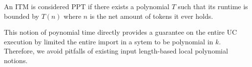\begin{center} {\small An ITM is considered PPT if there exists a polynomial $T$ such that its runtime is bounded by $T(n)$ where $n$ is the net amount of tokens it ever holds.} \end{center}

This notion of poynomial time directly provides a guarantee on the entire UC execution by limited the entire import in a sytem to be polynomial in $k$. Therefore, we avoid pitfalls of existing input length-based local polynomial notions.

%
%
%
